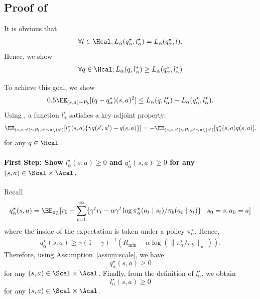 \subsection{Proof of  } 
It is obvious that 
\begin{align*}
   \forall l\in \Hcal; L_{\alpha}(q^{\star}_{\alpha},l^{\star}_{\alpha})= L_{\alpha}(q^{\star}_{\alpha},l).
\end{align*}
Hence, we show 
\begin{align*}
     \forall q\in \Hcal; L_{\alpha}(q,l^{\star}_{\alpha}) \geq L_{\alpha}(q^{\star}_{\alpha},l^{\star}_{\alpha})
\end{align*}

To achieve this goal, we show 
\begin{align}\label{eq:important}
0.5\EE_{(s,a)\sim P_b}[(q-q^{\star}_{\alpha})(s,a)^2]\leq L_{\alpha}(q,l^{\star}_{\alpha})-L_{\alpha}(q^{\star}_{\alpha},l^{\star}_{\alpha}). 
\end{align} 
Using , a function $l^{\star}_{\alpha}$ satisfies a key adjoint property: 
\begin{align}\label{eq:adjoint_propety}
 \EE_{(s,a,s')\sim P_b,a'\sim \pi^{\star}_{\alpha}(s
')}[l^{\star}_{\alpha}(s,a)\{\gamma q(s',a')-q(s,a) \} ]= -\EE_{(s,a,s')\sim P_b,a'\sim \pi^{\star}_{\alpha}(s
')}[q^{\star}_{\alpha}(s,a)q(s,a) ]. 
\end{align}
for any $q \in \Hcal$. 

\paragraph{First Step: Show $l^{\star}_{\alpha}(s,a)\geq 0$ and  $q^{\star}_{\alpha}(s,a)\geq 0$ for any $(s,a)\in \Scal \times \Acal$.}

Recall 
\begin{align*}
    q^{\star}_{\alpha}(s,a)=\EE_{\pi^{\star}_{\alpha}}[r_0+\sum_{t=1}^{\infty}\{\gamma^t r_t -\alpha \gamma^t \log \pi^{\star}_{\alpha}(a_t\mid s_t)/\pi_b(a_t\mid s_t)\}\mid s_0=s,a_0=a]
\end{align*}
where the inside of the expectation is taken under a policy $\pi^{\star}_{\alpha}$. Hence, 
\begin{align}
    q^{\star}_{\alpha}(s,a)\geq \gamma(1-\gamma)^{-1}(R_{\min} - \alpha \log(\|\pi^{\star}_{\alpha}/\pi_b\|_{\infty})). 
\end{align}
Therefore, using Assumption~\ref{assum:scale}, we have 
$$q^{\star}_{\alpha}(s,a)\geq 0$$ for any $(s,a)\in \Scal \times \Acal$. 
Finally, from the definition of $l^{\star}_{\alpha}$, we obtain $$l^{\star}_{\alpha}(s,a)\geq 0$$ for any $(s,a)\in \Scal \times \Acal$. 


